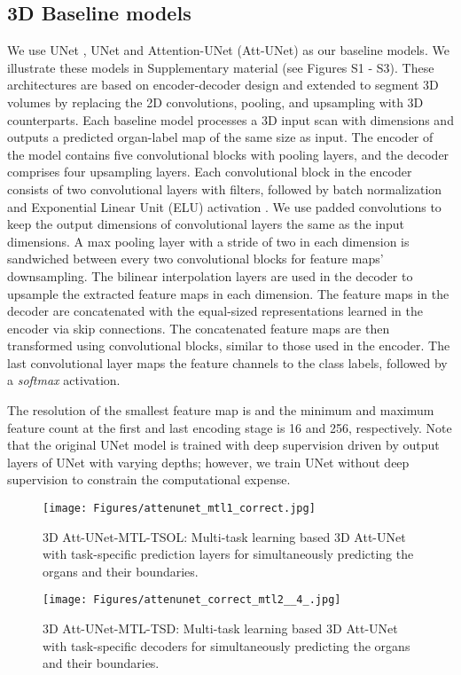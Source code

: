 \documentclass[final,5p,times,twocolumn]{elsarticle}
\begin{document}
\subsection{3D Baseline models}\label{sec:base}
We use UNet \cite{cciccek20163d}, UNet \cite{zhou2019unet++} and Attention-UNet (Att-UNet) \cite{schlemper2019attention} as our baseline models. We illustrate these models in Supplementary material (see Figures S1 - S3). These architectures are based on encoder-decoder design and extended to segment 3D volumes by replacing the 2D convolutions, pooling, and upsampling with 3D counterparts. Each baseline model processes a 3D input scan with dimensions  and outputs a predicted organ-label map of the same size as input. The encoder of the model contains five convolutional blocks with pooling layers, and the decoder comprises four upsampling layers. Each convolutional block in the encoder consists of two convolutional layers with  filters, followed by batch normalization and Exponential Linear Unit (ELU) activation \cite{DBLP:journals/corr/ClevertUH15}. We use padded convolutions to keep the output dimensions of convolutional layers the same as the input dimensions. A  max pooling layer with a stride of two in each dimension is sandwiched between every two convolutional blocks for feature maps’ downsampling. The bilinear interpolation layers are used in the decoder to upsample the extracted feature maps in each dimension. The feature maps in the decoder are concatenated with the equal-sized representations learned in the encoder via skip connections. The concatenated feature maps are then transformed using convolutional blocks, similar to those used in the encoder. The last  convolutional layer maps the feature channels to the class labels, followed by a \textit{softmax} activation.

The resolution of the smallest feature map is  and the minimum and maximum feature count at the first and last encoding stage is 16 and 256, respectively. Note that the original UNet model is trained with deep supervision driven by output layers of UNet with varying depths; however, we train UNet without deep supervision to constrain the computational expense.
\begin{figure}[!hbt]
\centering
\texttt{[image: Figures/attenunet\_mtl1\_correct.jpg]} 
\caption{3D Att-UNet-MTL-TSOL: Multi-task learning based 3D Att-UNet with task-specific prediction layers for simultaneously predicting the organs and their boundaries.}
\label{fig:attenunetmtl1}
\end{figure}
\begin{figure}[!hbt]
\centering
\texttt{[image: Figures/attenunet\_correct\_mtl2\_\_4\_.jpg]} 
\caption{3D Att-UNet-MTL-TSD: Multi-task learning based 3D Att-UNet with task-specific decoders for simultaneously predicting the organs and their boundaries.}
\label{fig:attenunetmtl2}
\end{figure}
\end{document}
